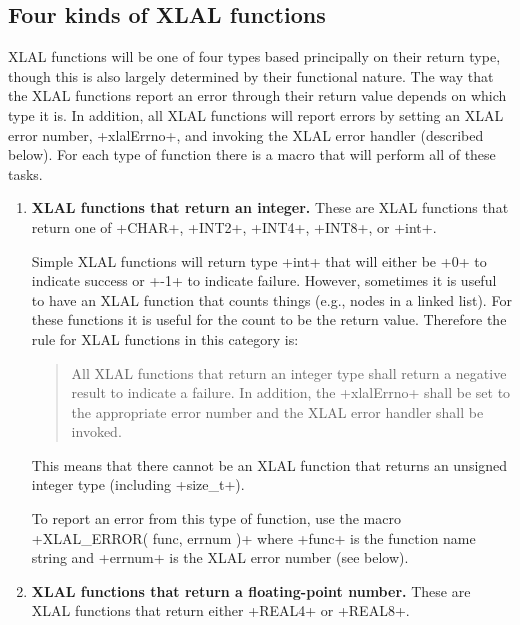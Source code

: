 \documentclass[10pt]{ligodcc}
\makeatletter
\def\verb{\relax\ifmmode\hbox\else\leavevmode\null\fi
  \bgroup
    \color{blue}\small
    \verb@eol@error \let\do\@makeother \dospecials
    \verbatim@font\@noligs
    \@ifstar\@sverb\@verb}
\newlength{\fminilength}
\newenvironment{fminipage}[1][\linewidth]
  {\setlength{\fminilength}{#1-2\fboxsep-2\fboxrule}%
   \begin{lrbox}{\fminibox}\begin{minipage}{\fminilength}}
  {\end{minipage}\end{lrbox}\noindent\fbox{\usebox{\fminibox}}}
\newenvironment{lalrule}{\begin{quote}\color{red}\begin{fminipage}}
  {\end{fminipage}\end{quote}}
\makeatother
\begin{document}
\subsection{Four kinds of XLAL functions}

XLAL functions will be one of four types based principally on their return
type, though this is also largely determined by their functional nature.  The
way that the XLAL functions report an error through their return value depends
on which type it is.  In addition, all XLAL functions will report errors by
setting an XLAL error number, \verb+xlalErrno+, and invoking the XLAL error
handler (described below).  For each type of function there is a macro that
will perform all of these tasks.

\begin{enumerate}
\item \textbf{XLAL functions that return an integer.}
These are XLAL functions that
return one of \verb+CHAR+, \verb+INT2+, \verb+INT4+, \verb+INT8+, or \verb+int+.

Simple XLAL functions will return type \verb+int+ that will either be \verb+0+
to indicate success or \verb+-1+ to indicate failure.  However, sometimes it is
useful to have an XLAL function that counts things (e.g., nodes in a linked
list).  For these functions it is useful for the count to be the return value.
Therefore the rule for XLAL functions in this category is:
\begin{lalrule}
All XLAL functions that return an integer type shall return a negative result
to indicate a failure.
In addition, the \verb+xlalErrno+ shall be set to the appropriate error number
and the XLAL error handler shall be invoked.
\end{lalrule}
This means that there cannot be an XLAL function that returns an unsigned
integer type (including \verb+size_t+).

To report an error from this type of function, use the macro
\verb+XLAL_ERROR( func, errnum )+ where \verb+func+ is the function name
string and \verb+errnum+ is the XLAL error number (see below).

\item \textbf{XLAL functions that return a floating-point number.}  These are
XLAL functions that return either \verb+REAL4+ or \verb+REAL8+.


\end{enumerate}
\end{document}
